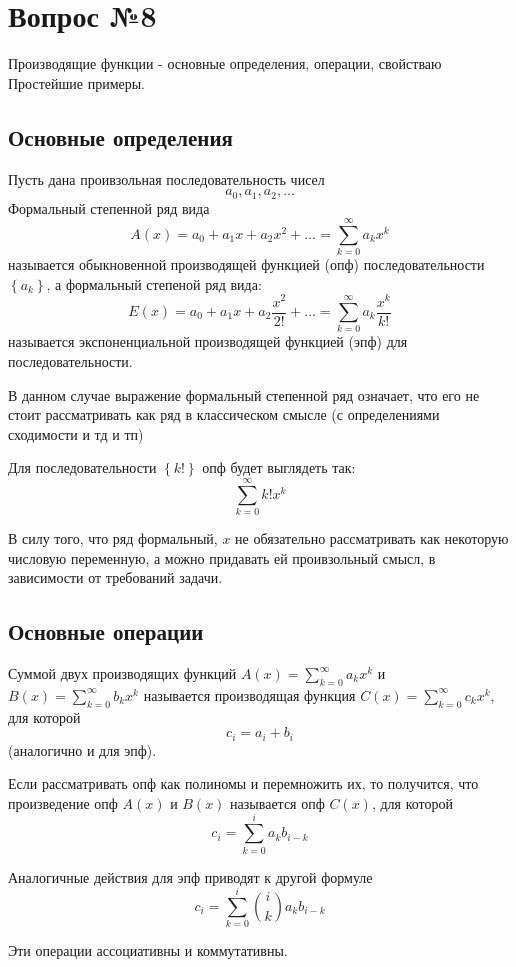 \chapter{Вопрос №8}

Производящие функции - основные определения, операции, свойстваю Простейшие примеры.

\section{Основные определения}

Пусть дана проивзольная последовательность чисел $$ a_0, a_1, a_2, ... $$
Формальный степенной ряд вида $$ A\left(x\right) = a_0 + a_1x + a_2x^2 + ... = \sum_{k=0}^\infty a_k x^k$$
называется обыкновенной производящей функцией (опф) последовательности $\left\{a_k\right\}$, а формальный степеной ряд вида: $$ E\left(x\right) = a_0 + a_1 x + a_2 \frac{x^2}{2!} + ... = \sum_{k=0}^\infty a_k\frac{x^k}{k!} $$
называется экспоненциальной производящей функцией (эпф) для последовательности.

В данном случае выражение формальный степенной ряд означает, что его не стоит рассматривать как ряд в классическом смысле (с определениями сходимости и тд и тп)

Для последовательности $\left\{k!\right\}$ опф будет выглядеть так: $$ \sum_{k=0}^\infty k! x^k $$

В силу того, что ряд формальный, $x$ не обязательно рассматривать как некоторую числовую переменную, а можно придавать ей проивзольный смысл, в зависимости от требований задачи.

\section{Основные операции}

Суммой двух производящих функций $A\left(x\right) = \sum_{k=0}^\infty a_k x^k$ и $B\left(x\right) = \sum_{k=0}^\infty b_k x^k$ называется производящая функция $C\left(x\right) = \sum_{k=0}^\infty c_k x^k$, для которой $$c_i = a_i + b_i$$ (аналогично и для эпф).

Если рассматривать опф как полиномы и перемножить их, то получится, что произведение опф $A\left(x\right)$ и $B\left(x\right)$ называется опф $C\left(x\right)$, для которой $$ c_i = \sum_{k=0}^i a_kb_{i-k}$$

Аналогичные действия для эпф приводят к другой формуле $$ c_i = \sum_{k=0}^i \binom{i}{k} a_kb_{i-k} $$

Эти операции ассоциативны и коммутативны.

